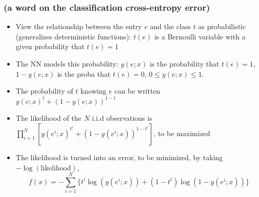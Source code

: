 \documentclass[12pt]{beamer}
\begin{document}
\begin{frame}
\frametitle{\small (a word on the classification cross-entropy error)}
\begin{itemize}
\item View the relationship between the entry $e$ and the class $t$ as probabilistic (generalizes deterministic functions): $t(e)$ is a Bernoulli variable with a given probability that $t(e)=1$
\item The NN models this probability: $y(e;x)$ is the probability that $t(e)=1$, $1-y(e;x)$ is the proba that $t(e)=0$, $0\le y(e;x) \le 1$.
\item The probability of $t$ knowing $e$ can be written $y(e;x)^{t}+(1-y(e;x))^{1-t}$
\item The likelihood of the $N$ i.i.d observations is $\prod_{i=1}^N \left[y(e^i;x)^{t^i}+(1-y(e^i;x))^{1-t^i}\right]$, to be maximized
\item The likelihood is turned into an error, to be minimized, by taking $-\log(\text{likelihood})$, 
\begin{equation*}
f(x) = - \sum_{i=1}^N \{ t^i \log(y(e^i;x)) + (1-t^i) \log(1 - y(e^i;x))\}
\end{equation*}
\end{itemize}
\end{frame}
\end{document}
